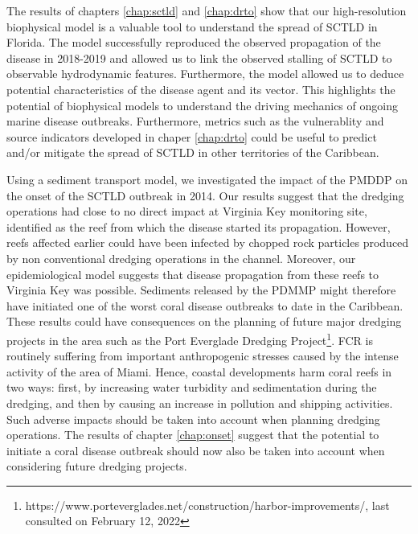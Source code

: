 The results of chapters \ref{chap:sctld} and \ref{chap:drto} show that our high-resolution biophysical model is a valuable tool to understand the spread of SCTLD in Florida. The model successfully reproduced the observed propagation of the disease in 2018-2019 and allowed us to link the observed stalling of SCTLD to observable hydrodynamic features. Furthermore, the model allowed us to deduce potential characteristics of the disease agent and its vector. This highlights the potential of biophysical models to understand the driving mechanics of ongoing marine disease outbreaks. Furthermore, metrics such as the vulnerablity and source indicators developed in chaper \ref{chap:drto} could be useful to predict and/or mitigate the spread of SCTLD in other territories of the Caribbean.

Using a sediment transport model, we investigated the impact of the PMDDP on the onset of the SCTLD outbreak in 2014. Our results suggest that the dredging operations had close to no direct impact at Virginia Key monitoring site, identified as the reef from which the disease started its propagation. However, reefs affected earlier could have been infected by chopped rock particles produced by non conventional dredging operations in the channel. Moreover, our epidemiological model suggests that disease propagation from these reefs to Virginia Key was possible. Sediments released by the PDMMP might therefore have initiated one of the worst coral disease outbreaks to date in the Caribbean. These results could have consequences on the planning of future major dredging projects in the area such as the Port Everglade Dredging Project\footnote{https://www.porteverglades.net/construction/harbor-improvements/, last consulted on February 12, 2022}. FCR is routinely suffering from important anthropogenic stresses caused by the intense activity of the area of Miami. Hence, coastal developments harm coral reefs in two ways: first, by increasing water turbidity and sedimentation during the dredging, and then by causing an increase in pollution and shipping activities. Such adverse impacts should be taken into account when planning dredging operations. The results of chapter \ref{chap:onset} suggest that the potential to initiate a coral disease outbreak should now also be taken into account when considering future dredging projects.

